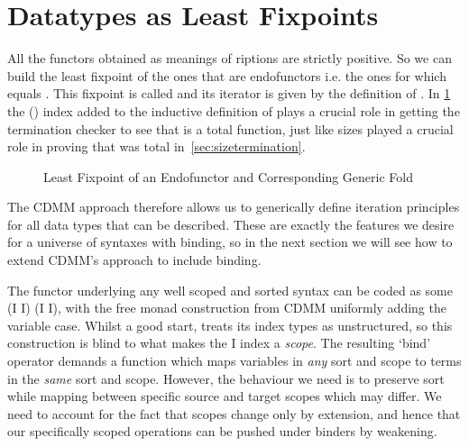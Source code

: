 \section{Datatypes as Least Fixpoints}

All the functors obtained as meanings of riptions are strictly positive.
So we can build the least fixpoint of the ones that are endofunctors i.e. the ones
for which  equals . This fixpoint is called  and its iterator is
given by the definition of  . In \cref{figure:datamu} the
 (\cite{DBLP:journals/corr/abs-1012-4896}) index added to the inductive
definition of  plays a crucial role in getting the termination checker to
see that  is a total function, just like sizes played a crucial role in
proving that  was total in~\cref{sec:sizetermination}.

\begin{figure}[h]
\caption{Least Fixpoint of an Endofunctor and Corresponding Generic Fold}\label{figure:datamu}
\end{figure}

The CDMM approach therefore allows us to generically define iteration principles
for all data types that can be described. These are exactly the features we desire
for a universe of syntaxes with binding, so in the next section we will see how
to extend CDMM's approach to include binding.

The functor underlying any well scoped and sorted syntax can be coded as some
{ (I \AR{$\times$}  I) (I \AR{$\times$}  I)}, with the
free monad construction from CDMM uniformly adding the variable case. Whilst a
good start,  treats its index types as unstructured, so this construction
is blind to what makes the { I} index a \emph{scope}. The resulting
`bind' operator demands a function which maps variables in \emph{any} sort and
scope to terms in the \emph{same} sort and scope. However, the behaviour we need
is to preserve sort while mapping between specific source and target scopes which
may differ. We need to account for the fact that scopes change only by extension,
and hence that our specifically scoped operations can be pushed under binders by
weakening.

